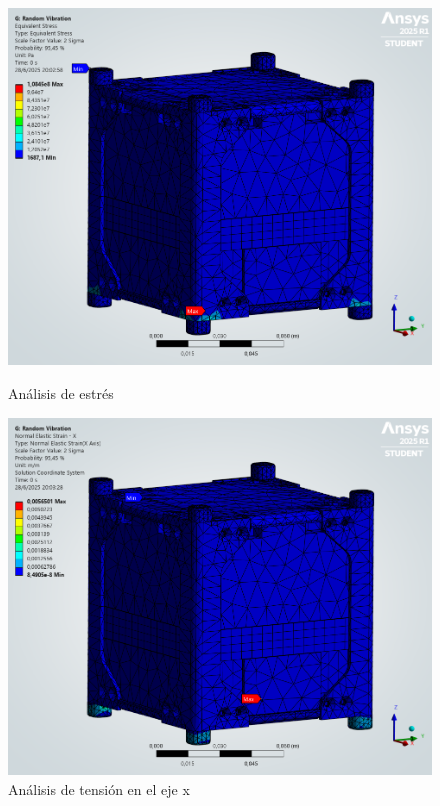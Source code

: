       \begin{figure}[H]
        \begin{minipage}{0.5\textwidth}
          \centering
          \includegraphics[width=\textwidth]{image/fem/ansys_cubesat-vibration_stress.png}
          \caption{Análisis de estrés}
          \label{fig:fem_stress}
        \end{minipage}
        \begin{minipage}{0.5\textwidth}
          \centering
          \includegraphics[width=\textwidth]{image/fem/ansys_cubesat-vibration_strain-x.png}
          \caption{Análisis de tensión en el eje x}
          \label{fig:fem_strain-x}
        \end{minipage}
      \end{figure}
